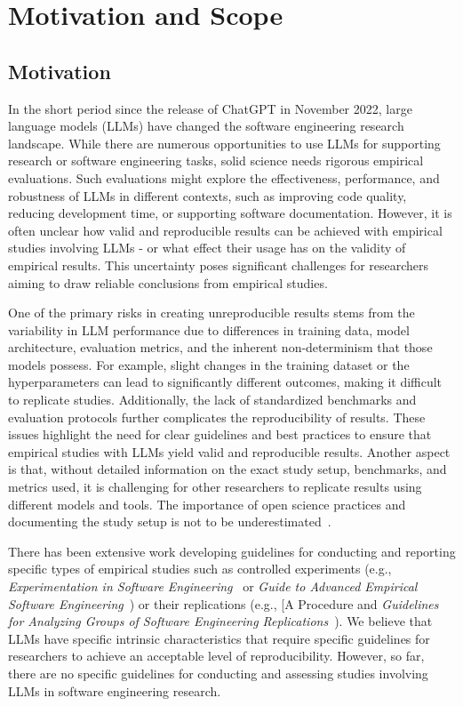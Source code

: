 



\section{Motivation and Scope}

\subsection{Motivation}

In the short period since the release of ChatGPT in November 2022, large language models (LLMs) have changed the software engineering research landscape.
While there are numerous opportunities to use LLMs for supporting research or software engineering tasks, solid science needs rigorous empirical evaluations.
Such evaluations might explore the effectiveness, performance, and robustness of LLMs in different contexts, such as improving code quality, reducing development time, or supporting software documentation.
However, it is often unclear how valid and reproducible results can be achieved with empirical studies involving LLMs - or what effect their usage has on the validity of empirical results.
This uncertainty poses significant challenges for researchers aiming to draw reliable conclusions from empirical studies.

One of the primary risks in creating unreproducible results stems from the variability in LLM performance due to differences in training data, model architecture, evaluation metrics, and the inherent non-determinism that those models possess.
For example, slight changes in the training dataset or the hyperparameters can lead to significantly different outcomes, making it difficult to replicate studies.
Additionally, the lack of standardized benchmarks and evaluation protocols further complicates the reproducibility of results.
These issues highlight the need for clear guidelines and best practices to ensure that empirical studies with LLMs yield valid and reproducible results.
Another aspect is that, without detailed information on the exact study setup, benchmarks, and metrics used, it is challenging for other researchers to replicate results using different models and tools.
The importance of open science practices and documenting the study setup is not to be underestimated~\cite{DBLP:journals/corr/abs-2412-17859}.

There has been extensive work developing guidelines for conducting and reporting specific types of empirical studies such as controlled experiments (e.g., \emph{Experimentation in Software Engineering}~\cite{DBLP:books/sp/WohlinRHORW24} or \emph{Guide to Advanced Empirical Software Engineering}~\cite{DBLP:books/sp/08/SSS2008}) or their replications (e.g., [A Procedure and \emph{Guidelines for Analyzing Groups of Software Engineering Replications}~\cite{DBLP:journals/tse/SantosVOJ21}).
We believe that LLMs have specific intrinsic characteristics that require specific guidelines for researchers to achieve an acceptable level of reproducibility.
However, so far, there are no specific guidelines for conducting and assessing studies involving LLMs in software engineering research.

